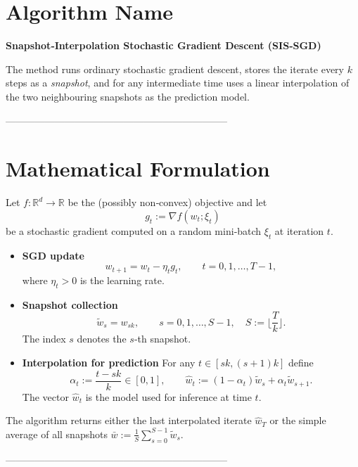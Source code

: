 \documentclass{article}
\newcommand{\RR}{\mathbb{R}}
\begin{document}
\section*{Algorithm Name}
\textbf{Snapshot‑Interpolation Stochastic Gradient Descent (SIS‑SGD)}  

The method runs ordinary stochastic gradient descent, stores the iterate every $k$ steps as a \emph{snapshot}, and for any intermediate time uses a linear interpolation of the two neighbouring snapshots as the prediction model.

--------------------------------------------------------------------

\section*{Mathematical Formulation}
Let $f:\RR^{d}\rightarrow\RR$ be the (possibly non‑convex) objective and let
\[
g_t:=\nabla f(w_t;\xi_t)
\]
be a stochastic gradient computed on a random mini‑batch $\xi_t$ at iteration $t$.
\begin{itemize}
    \item \textbf{SGD update}
    \begin{equation}
        w_{t+1}=w_t-\eta_t g_t,\qquad t=0,1,\dots,T-1,
        \label{eq:update}
    \end{equation}
    where $\eta_t>0$ is the learning rate.
    \item \textbf{Snapshot collection}
    \[
        \tilde w_{s}=w_{sk},\qquad s=0,1,\dots,S-1,\quad S:=\Big\lfloor\frac{T}{k}\Big\rfloor .
    \]
    The index $s$ denotes the $s$‑th snapshot.
    \item \textbf{Interpolation for prediction}
    For any $t\in[sk,(s+1)k]$ define
    \begin{equation}
        \alpha_t:=\frac{t-sk}{k}\in[0,1],\qquad 
        \hat w_t:=(1-\alpha_t)\tilde w_{s}+\alpha_t\tilde w_{s+1}.
        \label{eq:interp}
    \end{equation}
    The vector $\hat w_t$ is the model used for inference at time $t$.
\end{itemize}
The algorithm returns either the last interpolated iterate $\hat w_T$ or the simple average of all snapshots $\bar w:=\frac1S\sum_{s=0}^{S-1}\tilde w_s$.

--------------------------------------------------------------------
\end{document}
